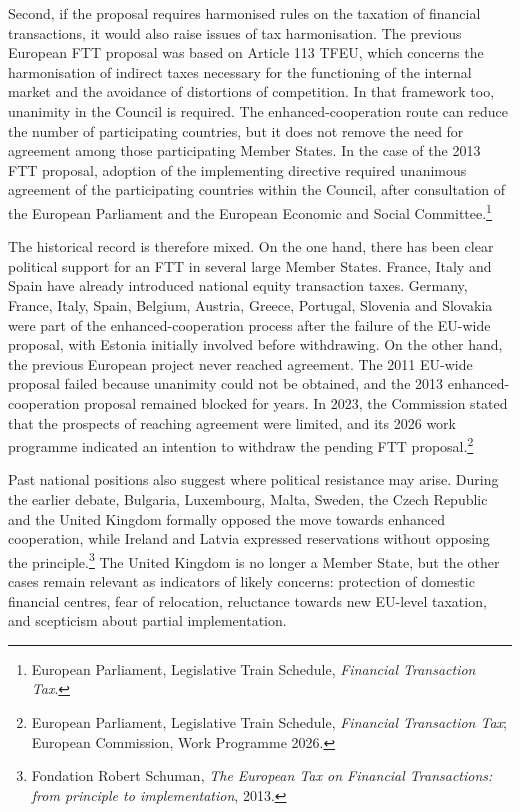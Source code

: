 \documentclass[../../main]{subfiles}
\begin{document}
Second, if the proposal requires harmonised rules on the taxation of financial transactions, it would also raise issues of tax harmonisation. The previous European FTT proposal was based on Article 113 TFEU, which concerns the harmonisation of indirect taxes necessary for the functioning of the internal market and the avoidance of distortions of competition. In that framework too, unanimity in the Council is required. The enhanced-cooperation route can reduce the number of participating countries, but it does not remove the need for agreement among those participating Member States. In the case of the 2013 FTT proposal, adoption of the implementing directive required unanimous agreement of the participating countries within the Council, after consultation of the European Parliament and the European Economic and Social Committee.\footnote{European Parliament, Legislative Train Schedule, \textit{Financial Transaction Tax}.}

The historical record is therefore mixed. On the one hand, there has been clear political support for an FTT in several large Member States. France, Italy and Spain have already introduced national equity transaction taxes. Germany, France, Italy, Spain, Belgium, Austria, Greece, Portugal, Slovenia and Slovakia were part of the enhanced-cooperation process after the failure of the EU-wide proposal, with Estonia initially involved before withdrawing. On the other hand, the previous European project never reached agreement. The 2011 EU-wide proposal failed because unanimity could not be obtained, and the 2013 enhanced-cooperation proposal remained blocked for years. In 2023, the Commission stated that the prospects of reaching agreement were limited, and its 2026 work programme indicated an intention to withdraw the pending FTT proposal.\footnote{European Parliament, Legislative Train Schedule, \textit{Financial Transaction Tax}; European Commission, Work Programme 2026.}

Past national positions also suggest where political resistance may arise. During the earlier debate, Bulgaria, Luxembourg, Malta, Sweden, the Czech Republic and the United Kingdom formally opposed the move towards enhanced cooperation, while Ireland and Latvia expressed reservations without opposing the principle.\footnote{Fondation Robert Schuman, \textit{The European Tax on Financial Transactions: from principle to implementation}, 2013.} The United Kingdom is no longer a Member State, but the other cases remain relevant as indicators of likely concerns: protection of domestic financial centres, fear of relocation, reluctance towards new EU-level taxation, and scepticism about partial implementation.
\end{document}
